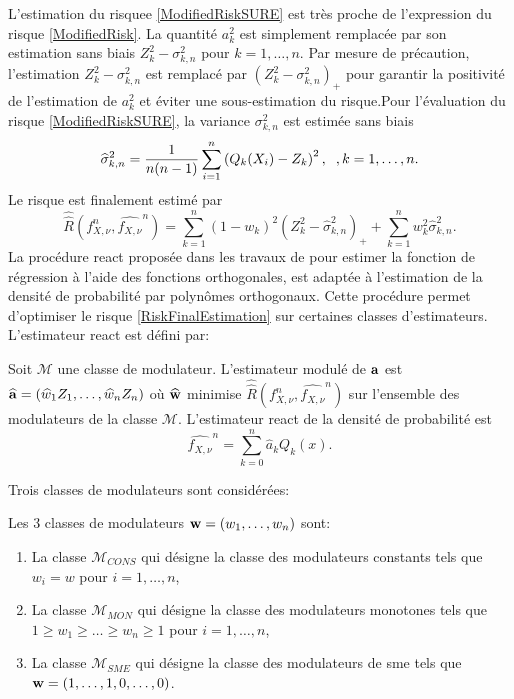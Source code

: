 L\rq{}estimation du risquee \eqref{ModifiedRiskSURE} est très proche de l\rq{}expression du risque \eqref{ModifiedRisk}. La quantité $a_{k}^{2}$ est simplement remplacée par son estimation sans biais $Z_{k}^{2}-\sigma_{k,n}^{2}$ pour $k=1,\ldots,n$. Par mesure de précaution, l'estimation $Z_{k}^{2}-\sigma_{k,n}^{2}$ est remplacé par $\left(Z_{k}^{2}-\sigma_{k,n}^{2}\right)_{+}$ pour garantir la positivité de l\rq{}estimation de $a_{k}^{2}$ et éviter une sous-estimation du risque.Pour l\rq{}évaluation du risque \eqref{ModifiedRiskSURE}, la variance $\sigma^{2}_{k,n}$ est estimée sans biais  
\begin{equation}\label{VarianceEstimation}
\widehat{\sigma}_{k,n}^{2}=\frac{1}{n(n-1)}\sum_{i=1}^{n}\left(Q_{k}(X_{i})-Z_{k}\right)^{2},\hspace{0.2cm},k=1,\ldots,n.
\end{equation}
Le risque est finalement estimé par 
\begin{equation}\label{RiskFinalEstimation}
\widehat{\widehat{R}}\left(f_{X,\nu}^{n},\widehat{f_{X,\nu}}^{n} \right)=\sum_{k=1}^{n}(1-w_{k})^{2}\left(Z_{k}^{2}-\widehat{\sigma}_{k,n}^{2}\right)_{+}+\sum_{k=1}^{n}w_{k}^{2}\widehat{\sigma}_{k,n}^{2}.
\end{equation}
La procédure \gls{react} proposée dans les travaux de \citet{Be00} pour estimer la fonction de régression à l'aide des fonctions orthogonales, est adaptée à l'estimation de la densité de probabilité par polynômes orthogonaux. Cette procédure permet d\rq{}optimiser le risque \eqref{RiskFinalEstimation} sur certaines classes d\rq{}estimateurs.  L'estimateur \gls{react} est défini par:
\begin{Def}
Soit $\mathcal{M}$ une classe de modulateur. L'estimateur modulé de $\bold{a}$ est $\widehat{\bold{a}}=(\widehat{w}_{1}Z_{1},\ldots,\widehat{w}_{n}Z_{n})$ où $\widehat{\bold{w}}$ minimise $\widehat{\widehat{R}}\left(f_{X,\nu}^{n},\widehat{f_{X,\nu}}^{n} \right)$ sur l'ensemble des modulateurs de la classe $\mathcal{M}$. L'estimateur \gls{react} de la densité de probabilité est 
\begin{equation*}
\widehat{f_{X,\nu}}^{n}=\sum_{k=0}^{n}\widehat{a}_{k}Q_{k}(x).
\end{equation*}
\end{Def}
Trois classes de modulateurs sont considérées:
\begin{Def}
Les $3$ classes de modulateurs $\bold{w}=(w_{1},\ldots,w_{n})$ sont:
\begin{enumerate}
\item La classe $\mathcal{M}_{CONS}$ qui désigne la classe des modulateurs constants tels que $w_{i}=w$ pour $i=1,\ldots,n$, 
\item La classe $\mathcal{M}_{MON}$ qui désigne la classe des modulateurs monotones tels que $1\geq w_{1}\geq\ldots\geq w_{n}\geq 1$ pour $i=1,\ldots,n$,
\item La classe $\mathcal{M}_{SME}$ qui désigne la classe des modulateurs de \gls{sme} tels que $\bold{w}=(1,\ldots,1,0,\ldots,0)$.
\end{enumerate}
\end{Def}

